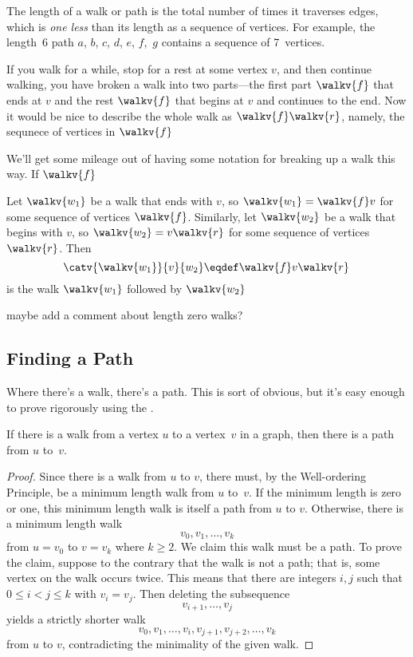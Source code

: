 The length of a walk or path is the total number of times it traverses
edges, which is \emph{one less} than its length as a sequence of
vertices.  For example, the length~6 path $a$, $b$, $c$, $d$, $e$,
$f$,~$g$ contains a sequence of 7~vertices.

If you walk for a while, stop for a rest at some vertex $v$, and then
continue walking, you have broken a walk into two parts---the first part
$\walkv{f}$ that ends at $v$ and the rest $\walkv{f}$ that begins at $v$
and continues to the end.  Now it would be nice to describe the whole walk
as $\walkv{f}\walkv{r}$, namely, the sequnece of vertices in $\walkv{f}$ 

We'll get some mileage \smiley out of having
some notation for breaking up a walk this way.  If $\walkv{f}$

Let $\walkv{w_1}$ be a walk that ends with $v$, so $\walkv{w_1} =
\walkv{f}v$ for some sequence of vertices $\walkv{f}$.  Similarly, let
$\walkv{w_2}$ be a walk that begins with $v$, so $\walkv{w_2} =
v\walkv{r}$ for some sequence of vertices $\walkv{r}$. Then
\[
\catv{\walkv{w_1}}{v}{w_2} \eqdef \walkv{f}v\walkv{r}\,
\]
is the walk $\walkv{w_1}$ followed by $\walkv{w_2}$

\begin{editingnotes}
maybe add a comment about length zero walks?
\end{editingnotes}

\subsection{Finding a Path}

Where there's a walk, there's a path.  This is sort of obvious, but
it's easy enough to prove rigorously using the .

\begin{lemma}\label{simplepath}
If there is a walk from a vertex $u$ to a vertex~$v$ in a graph, then
there is a path from $u$ to~$v$.
\end{lemma}

\begin{proof}
Since there is a walk from $u$ to $v$, there must, by the
Well-ordering Principle, be a minimum length walk from $u$ to~$v$.  If
the minimum length is zero or one, this minimum length walk is itself
a path from $u$ to $v$.  Otherwise, there is a minimum length walk
\[
v_0, v_1, \dots, v_k
\]
from $u = v_0$ to $v = v_k$ where $k \geq 2$.  We claim this walk must
be a path.  To prove the claim, suppose to the contrary that the walk
is not a path; that is, some vertex on the walk occurs twice.  This
means that there are integers $i,j$ such that $0 \leq i < j \leq k$
with $v_i= v_j$.  Then deleting the subsequence
\[
    v_{i+1}, \dots, v_j
\]
yields a strictly shorter walk
\[
    v_0, v_1,\dots, v_i,v_{j+1},v_{j+2},\dots, v_k
\]
from $u$ to $v$, contradicting the minimality of the given walk.
\end{proof}


